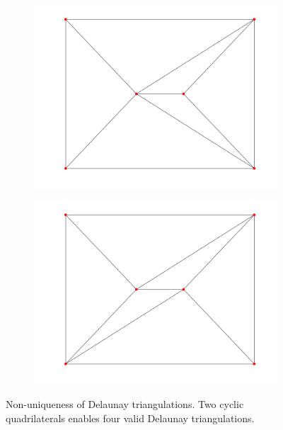 \begin{figure}[ht]
\begin{subfigure}[b]{0.2\textwidth}
        \centering
        \includegraphics[width=\textwidth]{report/Images/Theory/triangulation/triangulation_delaunay2.png}
        \label{fig:triangulation-delaunay2}
    \end{subfigure}
    \hfill
    \begin{subfigure}[b]{0.2\textwidth}
        \centering
        \includegraphics[width=\textwidth]{report/Images/Theory/triangulation/triangulation_delaunay4.png}
        \label{fig:triangulation-delaunay4}
    \end{subfigure}
    \caption[Non-uniqueness of Delaunay triangulations]{Non-uniqueness of Delaunay triangulations. Two cyclic quadrilaterals enables four valid Delaunay triangulations.}
    \label{fig:non-unique-delaunay}
\end{figure}




